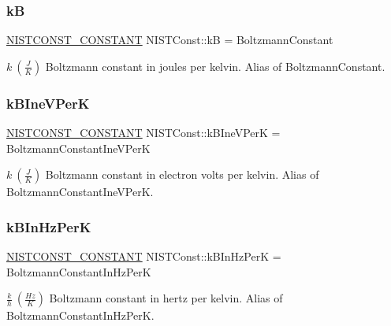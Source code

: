 \subsubsection{\texorpdfstring{kB}{kB}}
{\footnotesize\ttfamily \mbox{\hyperlink{group___n_i_s_t_const-_macros_ga2b0fc1d7452373f816175dd86ce26729}{N\+I\+S\+T\+C\+O\+N\+S\+T\+\_\+\+C\+O\+N\+S\+T\+A\+NT}} N\+I\+S\+T\+Const\+::kB = Boltzmann\+Constant}

$k \ (\frac{J}{K})$ Boltzmann constant in joules per kelvin. Alias of Boltzmann\+Constant. \mbox{\label{group___n_i_s_t_const-_boltzmann_constant_gaff1f95d2460f026bdffd566e2569ff6d}} 
\subsubsection{\texorpdfstring{k\+B\+Ine\+V\+PerK}{kBIneVPerK}}
{\footnotesize\ttfamily \mbox{\hyperlink{group___n_i_s_t_const-_macros_ga2b0fc1d7452373f816175dd86ce26729}{N\+I\+S\+T\+C\+O\+N\+S\+T\+\_\+\+C\+O\+N\+S\+T\+A\+NT}} N\+I\+S\+T\+Const\+::k\+B\+Ine\+V\+PerK = Boltzmann\+Constant\+Ine\+V\+PerK}

$k \ (\frac{J}{K})$ Boltzmann constant in electron volts per kelvin. Alias of Boltzmann\+Constant\+Ine\+V\+PerK. \mbox{\label{group___n_i_s_t_const-_boltzmann_constant_gada6cdc6c5e57c4feb627847e83f00837}} 
\subsubsection{\texorpdfstring{k\+B\+In\+Hz\+PerK}{kBInHzPerK}}
{\footnotesize\ttfamily \mbox{\hyperlink{group___n_i_s_t_const-_macros_ga2b0fc1d7452373f816175dd86ce26729}{N\+I\+S\+T\+C\+O\+N\+S\+T\+\_\+\+C\+O\+N\+S\+T\+A\+NT}} N\+I\+S\+T\+Const\+::k\+B\+In\+Hz\+PerK = Boltzmann\+Constant\+In\+Hz\+PerK}

$\frac{k}{h} \ (\frac{Hz}{K})$ Boltzmann constant in hertz per kelvin. Alias of Boltzmann\+Constant\+In\+Hz\+PerK. \mbox{\label{group___n_i_s_t_const-_boltzmann_constant_ga2c0dddb127fe4e8eab50714b98b122b3}} 
